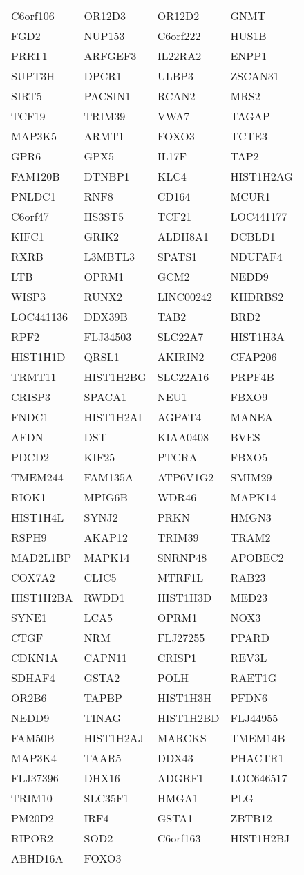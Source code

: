 {\begin{longtable}{llll}
C6orf106&OR12D3&OR12D2&GNMT\tabularnewline
FGD2&NUP153&C6orf222&HUS1B\tabularnewline
PRRT1&ARFGEF3&IL22RA2&ENPP1\tabularnewline
SUPT3H&DPCR1&ULBP3&ZSCAN31\tabularnewline
\newpage
SIRT5&PACSIN1&RCAN2&MRS2\tabularnewline
TCF19&TRIM39&VWA7&TAGAP\tabularnewline
MAP3K5&ARMT1&FOXO3&TCTE3\tabularnewline
GPR6&GPX5&IL17F&TAP2\tabularnewline
FAM120B&DTNBP1&KLC4&HIST1H2AG\tabularnewline
PNLDC1&RNF8&CD164&MCUR1\tabularnewline
C6orf47&HS3ST5&TCF21&LOC441177\tabularnewline
KIFC1&GRIK2&ALDH8A1&DCBLD1\tabularnewline
RXRB&L3MBTL3&SPATS1&NDUFAF4\tabularnewline
LTB&OPRM1&GCM2&NEDD9\tabularnewline
WISP3&RUNX2&LINC00242&KHDRBS2\tabularnewline
LOC441136&DDX39B&TAB2&BRD2\tabularnewline
RPF2&FLJ34503&SLC22A7&HIST1H3A\tabularnewline
HIST1H1D&QRSL1&AKIRIN2&CFAP206\tabularnewline
TRMT11&HIST1H2BG&SLC22A16&PRPF4B\tabularnewline
CRISP3&SPACA1&NEU1&FBXO9\tabularnewline
FNDC1&HIST1H2AI&AGPAT4&MANEA\tabularnewline
AFDN&DST&KIAA0408&BVES\tabularnewline
PDCD2&KIF25&PTCRA&FBXO5\tabularnewline
TMEM244&FAM135A&ATP6V1G2&SMIM29\tabularnewline
RIOK1&MPIG6B&WDR46&MAPK14\tabularnewline
HIST1H4L&SYNJ2&PRKN&HMGN3\tabularnewline
RSPH9&AKAP12&TRIM39&TRAM2\tabularnewline
MAD2L1BP&MAPK14&SNRNP48&APOBEC2\tabularnewline
COX7A2&CLIC5&MTRF1L&RAB23\tabularnewline
HIST1H2BA&RWDD1&HIST1H3D&MED23\tabularnewline
SYNE1&LCA5&OPRM1&NOX3\tabularnewline
CTGF&NRM&FLJ27255&PPARD\tabularnewline
CDKN1A&CAPN11&CRISP1&REV3L\tabularnewline
SDHAF4&GSTA2&POLH&RAET1G\tabularnewline
OR2B6&TAPBP&HIST1H3H&PFDN6\tabularnewline
NEDD9&TINAG&HIST1H2BD&FLJ44955\tabularnewline
FAM50B&HIST1H2AJ&MARCKS&TMEM14B\tabularnewline
MAP3K4&TAAR5&DDX43&PHACTR1\tabularnewline
FLJ37396&DHX16&ADGRF1&LOC646517\tabularnewline
TRIM10&SLC35F1&HMGA1&PLG\tabularnewline
PM20D2&IRF4&GSTA1&ZBTB12\tabularnewline
RIPOR2&SOD2&C6orf163&HIST1H2BJ\tabularnewline
ABHD16A&FOXO3&&\tabularnewline
\bottomrule
\end{longtable}}
\addtocounter{table}{-1}

